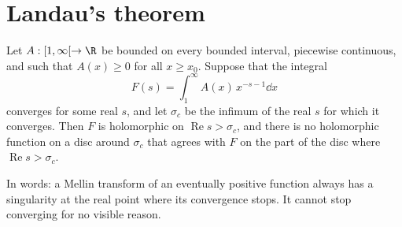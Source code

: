 \section{Landau's theorem}

\begin{theorem}[Landau, 1905]\label{thm:landau}
Let $A:[1,\infty[\to\R$ be bounded on every bounded interval, piecewise continuous, and such that $A(x)\ge0$ for all $x\ge x_0$. Suppose that the integral
\[
F(s)=\int_1^\infty A(x)\,x^{-s-1}\dd x
\]
converges for some real $s$, and let $\sigma_c$ be the infimum of the real $s$ for which it converges. Then $F$ is holomorphic on $\operatorname{Re}s>\sigma_c$,
and there is no holomorphic function on a disc around $\sigma_c$ that agrees with $F$ on the part of the disc where $\operatorname{Re}s>\sigma_c$.
\end{theorem}

In words: a Mellin transform of an eventually positive function always has a singularity at the real point where its convergence stops. It cannot stop
converging for no visible reason.

